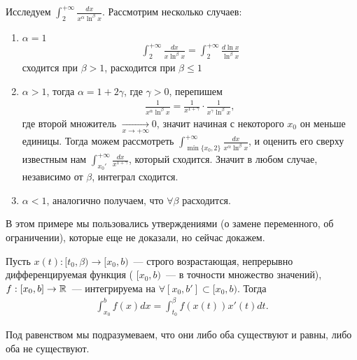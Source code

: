 \documentclass[../main.tex]{subfiles}
\begin{document}
    \begin{example}
    Исследуем $\int_{2}^{+\infty} \frac{dx}{x^{\alpha}\ln^{\beta} x}$. Рассмотрим несколько случаев:
    \begin{enumerate}
        \item $\alpha=1$ 
        \begin{gather} 
          \int_{2}^{+\infty} \frac{dx}{x \ln^{\beta} x} = \int_{2}^{+\infty} \frac{d \ln x}{ \ln^{\beta}x} 
        \end{gather} 
        сходится при $\beta > 1$, расходится при $\beta \leq 1$
        \item $\alpha>1$, тогда $\alpha = 1 + 2 \gamma$, где $\gamma > 0$, перепишем 
        \begin{gather} 
          \frac{1}{x^{\alpha} \ln^{\beta}x} = \frac{1}{x^{1+\gamma}} \cdot \frac{1}{x^{\gamma} \ln^{\beta}x} ,
        \end{gather} 
        где второй множитель $ \xrightarrow[x \to  + \infty ]{} 0 $, значит начиная с некоторого $x_0 $ он меньше единицы. Тогда можем рассмотреть $\int_{\min \{x_0, 2\}}^{+\infty} \frac{dx}{x^{\alpha}\ln^{\beta} x}$, и оценить его сверху известным нам $ \int_{x_0 '}^{+ \infty} \frac{dx}{x^{1+\gamma}} $, который сходится. Значит в любом случае, независимо от $\beta $, интеграл сходится.
        \item $\alpha < 1$, аналогично получаем, что $\forall \beta$ расходится.
    \end{enumerate}

    \end{example}

    \begin{note}
        В этом примере мы пользовались утверждениями (о замене переменного, об ограничении), которые еще не доказали, но сейчас докажем.
    \end{note}

    
    \begin{proposition}
      Пусть $x(t): [t_0, \beta) \to [x_0, b)$~--- строго возрастающая, непрерывно дифференцируемая функция ( $[x_0,b)$~--- в точности множество значений), $f:[x_0, b] \to \mathbb{R}$~--- интегрируема на $\forall [x_0, b'] \subset [x_0, b)$. Тогда 
      \begin{gather} 
        \int_{x_0 }^{b} f(x) dx = \int_{t_0 }^{\beta} f(x(t)) x'(t) dt .
      \end{gather}
    \end{proposition}
    
    
    \begin{note}
      Под равенством мы подразумеваем, что они либо оба существуют и равны, либо оба не существуют.
    \end{note}
    
\end{document}
